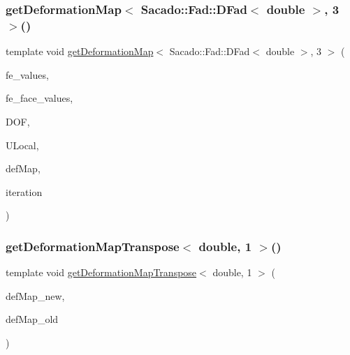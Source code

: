 \mbox{\label{function_evaluations_8cc_a2b4c316f681796502a2308af3aaf6627}} 
\subsubsection{\texorpdfstring{get\+Deformation\+Map$<$ Sacado\+::\+Fad\+::\+D\+Fad$<$ double $>$, 3 $>$()}{getDeformationMap< Sacado::Fad::DFad< double >, 3 >()}\hspace{0.1cm}{\footnotesize\ttfamily [2/2]}}
{\footnotesize\ttfamily template void \mbox{\hyperlink{group___evaluation_functions_ga239b206235603af9482484c29c8d57ea}{get\+Deformation\+Map}}$<$ Sacado\+::\+Fad\+::\+D\+Fad$<$ double $>$, 3 $>$ (\begin{DoxyParamCaption}\item[{const F\+E\+Values$<$ 3 $>$ \&}]{fe\+\_\+values,  }\item[{const F\+E\+Face\+Values$<$ 3 $>$ \&}]{fe\+\_\+face\+\_\+values,  }\item[{unsigned int}]{D\+OF,  }\item[{Table$<$ 1, Sacado\+::\+Fad\+::\+D\+Fad$<$ double $>$$>$ \&}]{U\+Local,  }\item[{\mbox{\hyperlink{structdeformation_map}{deformation\+Map}}$<$ Sacado\+::\+Fad\+::\+D\+Fad$<$ double $>$, 3 $>$ \&}]{def\+Map,  }\item[{unsigned int}]{iteration }\end{DoxyParamCaption})}

\mbox{\label{function_evaluations_8cc_a7e7354d28657df00b72c866eccede24a}} 
\subsubsection{\texorpdfstring{get\+Deformation\+Map\+Transpose$<$ double, 1 $>$()}{getDeformationMapTranspose< double, 1 >()}}
{\footnotesize\ttfamily template void \mbox{\hyperlink{group___evaluation_functions_gad4003712a2346a79e13bdbfcad4d1e1c}{get\+Deformation\+Map\+Transpose}}$<$ double, 1 $>$ (\begin{DoxyParamCaption}\item[{\mbox{\hyperlink{structdeformation_map}{deformation\+Map}}$<$ double, 1 $>$ \&}]{def\+Map\+\_\+new,  }\item[{\mbox{\hyperlink{structdeformation_map}{deformation\+Map}}$<$ double, 1 $>$ \&}]{def\+Map\+\_\+old }\end{DoxyParamCaption})}

